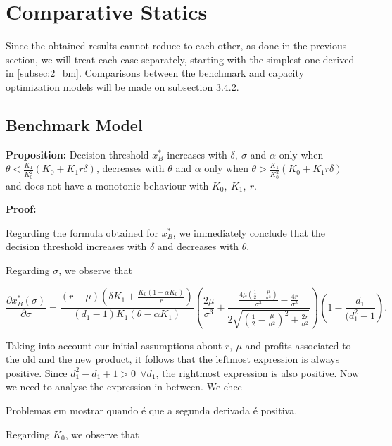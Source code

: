\section{Comparative Statics}
Since the obtained results cannot reduce to each other, as done in the previous section, we will treat each case separately, starting with the simplest one derived in \ref{subsec:2_bm}.
Comparisons between the benchmark and capacity optimization models will be made on subsection 3.4.2.\\

\subsection{Benchmark Model}


\textbf{Proposition:}
Decision threshold $x^*_B$ increases with $ \delta, \ \sigma$ and $\alpha$ only when $\theta < \frac{K_1}{ K_0^2} (K_0+K_1 r \delta)$, decreases with $\theta$ and $\alpha$ only when $\theta > \frac{K_1}{ K_0^2} (K_0+K_1 r \delta)$ and does not have a monotonic behaviour with $K_0, \ K_1, \ r$.


\textbf{Proof:}

Regarding the formula obtained for  $x^*_B$, we immediately conclude that the decision threshold increases with $\delta$ and decreases with $\theta$.

Regarding $\sigma$, we observe that


$$    \frac{\partial x^*_B ( \sigma ) }{\partial \sigma}= 
\frac{(r-\mu )  \left(\delta  K_1+\frac{K_0(1-\alpha K_0)}{r}\right)}{(d_1-1) K_1 (\theta -\alpha  K_1)} \left(\frac{2 \mu }{\sigma ^3}+\frac{\frac{4 \mu  \left(\frac{1}{2}-\frac{\mu }{\sigma ^2}\right)}{\sigma ^3}-\frac{4 r}{\sigma ^3}}{2 \sqrt{\left(\frac{1}{2}-\frac{\mu }{\sigma ^2}\right)^2+\frac{2 r}{\sigma ^2}}}\right) \left( 1- \frac{d_1}{(d_1^2-1} \right).$$


Taking into account our initial assumptions about $r, \ \mu$ and profits associated to the old and the new product, it follows that the leftmost expression is always positive. Since $d_1^2-d_1+1>0 \ \ \forall d_1$, the rightmost expression is also positive. Now we need to analyse the expression in between. We chec

Problemas em mostrar quando é que a segunda derivada é positiva.

Regarding $K_0$, we observe that

